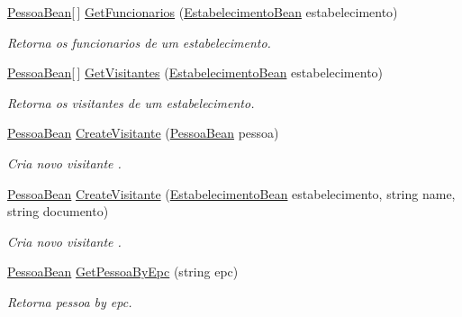 \begin{DoxyCompactItemize}
\hyperlink{class_cruzeiro_1_1_core_1_1_model_1_1_beans_1_1_pessoa_bean}{Pessoa\+Bean}\mbox{[}$\,$\mbox{]} \hyperlink{class_cruzeiro_1_1_web_service_1_1_core_1_1_client_1_1_dados_cadastrais_client_ae6802903d44a7cc43281416aa69e7cd2}{Get\+Funcionarios} (\hyperlink{class_cruzeiro_1_1_core_1_1_model_1_1_beans_1_1_estabelecimento_bean}{Estabelecimento\+Bean} estabelecimento)
\begin{DoxyCompactList}\small\item\em Retorna os funcionarios de um estabelecimento. \end{DoxyCompactList}\item 
\hyperlink{class_cruzeiro_1_1_core_1_1_model_1_1_beans_1_1_pessoa_bean}{Pessoa\+Bean}\mbox{[}$\,$\mbox{]} \hyperlink{class_cruzeiro_1_1_web_service_1_1_core_1_1_client_1_1_dados_cadastrais_client_a18f7d86a9cbe419618c7bf4906768d93}{Get\+Visitantes} (\hyperlink{class_cruzeiro_1_1_core_1_1_model_1_1_beans_1_1_estabelecimento_bean}{Estabelecimento\+Bean} estabelecimento)
\begin{DoxyCompactList}\small\item\em Retorna os visitantes de um estabelecimento. \end{DoxyCompactList}\item 
\hyperlink{class_cruzeiro_1_1_core_1_1_model_1_1_beans_1_1_pessoa_bean}{Pessoa\+Bean} \hyperlink{class_cruzeiro_1_1_web_service_1_1_core_1_1_client_1_1_dados_cadastrais_client_a72db90605df986388e02f1fe0b090a74}{Create\+Visitante} (\hyperlink{class_cruzeiro_1_1_core_1_1_model_1_1_beans_1_1_pessoa_bean}{Pessoa\+Bean} pessoa)
\begin{DoxyCompactList}\small\item\em Cria novo visitante . \end{DoxyCompactList}\item 
\hyperlink{class_cruzeiro_1_1_core_1_1_model_1_1_beans_1_1_pessoa_bean}{Pessoa\+Bean} \hyperlink{class_cruzeiro_1_1_web_service_1_1_core_1_1_client_1_1_dados_cadastrais_client_a38f0e1050db62f1fec13aa5052bef724}{Create\+Visitante} (\hyperlink{class_cruzeiro_1_1_core_1_1_model_1_1_beans_1_1_estabelecimento_bean}{Estabelecimento\+Bean} estabelecimento, string name, string documento)
\begin{DoxyCompactList}\small\item\em Cria novo visitante . \end{DoxyCompactList}\item 
\hyperlink{class_cruzeiro_1_1_core_1_1_model_1_1_beans_1_1_pessoa_bean}{Pessoa\+Bean} \hyperlink{class_cruzeiro_1_1_web_service_1_1_core_1_1_client_1_1_dados_cadastrais_client_a899b15d7f76e1b7d7ca937a0dd4f921f}{Get\+Pessoa\+By\+Epc} (string epc)
\begin{DoxyCompactList}\small\item\em Retorna pessoa by epc. \end{DoxyCompactList}\end{DoxyCompactItemize}

